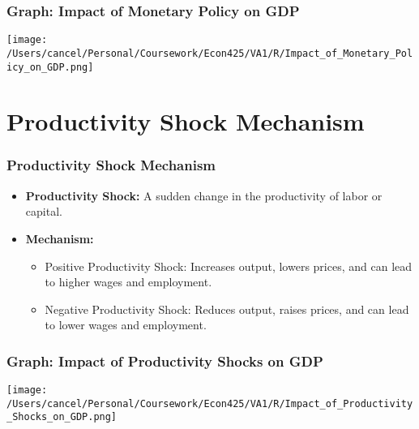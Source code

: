 \documentclass{beamer}
\begin{document}
\begin{frame}
    \frametitle{Graph: Impact of Monetary Policy on GDP}
    \begin{center}
        \texttt{[image: /Users/cancel/Personal/Coursework/Econ425/VA1/R/Impact\_of\_Monetary\_Policy\_on\_GDP.png]}
    \end{center}
\end{frame}

\section{Productivity Shock Mechanism}
\begin{frame}
    \frametitle{Productivity Shock Mechanism}
    \begin{itemize}
        \item \textbf{Productivity Shock:} A sudden change in the productivity of labor or capital.
        \item \textbf{Mechanism:}
        \begin{itemize}
            \item Positive Productivity Shock: Increases output, lowers prices, and can lead to higher wages and employment.
            \item Negative Productivity Shock: Reduces output, raises prices, and can lead to lower wages and employment.
        \end{itemize}
    \end{itemize}
\end{frame}

\begin{frame}
    \frametitle{Graph: Impact of Productivity Shocks on GDP}
    \begin{center}
        \texttt{[image: /Users/cancel/Personal/Coursework/Econ425/VA1/R/Impact\_of\_Productivity\_Shocks\_on\_GDP.png]}
    \end{center}
\end{frame}
\end{document}

